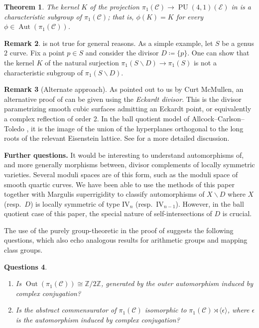 \documentclass[11pt]{amsart}
\theoremstyle{plain}
\newtheorem{thm}{Theorem}[section]
\newtheorem{qtns}[thm]{Questions}
\theoremstyle{definition}
\newtheorem{rem}[thm]{Remark}
\theoremstyle{remark}
\newcommand{\bbZ}{\mathbb{Z}}
\newcommand{\calC}{\mathcal{C}}
\newcommand{\calE}{\mathcal{E}}
\newcommand{\ep}{\epsilon}
\DeclareMathOperator{\PU}{PU}
\DeclareMathOperator{\Aut}{Aut}
\DeclareMathOperator{\Out}{Out}
\newcommand{\ssm}{\smallsetminus}
\begin{document}
\begin{thm}\label{thmKchar}
The kernel $K$ of the projection $\pi_1(\calC) \to \PU(4,1)(\calE)$ in  is a \emph{characteristic} subgroup of $\pi_1(\calC)$; that is, $\phi(K)=K$ for every $\phi\in\Aut(\pi_1(\calC))$.
\end{thm}

\begin{rem}
 is not true for general reasons. As a simple example, let $S$ be a genus $2$ curve. Fix a point $p\in S$ and consider the divisor $D \coloneqq \{p\}$. One can show that the kernel $K$ of the natural surjection $\pi_1(S\ssm D) \to \pi_1(S)$ is not a characteristic subgroup of ${\pi_1(S\ssm D)}$.
\end{rem}

\begin{rem}[Alternate approach]\label{rmk0} 
As pointed out to us by Curt McMullen, an alternative proof of  can be given using the \emph{Eckardt divisor}. This is the divisor parametrizing smooth cubic surfaces admitting an Eckardt point, or equivalently a complex reflection of order 2. In the ball quotient model of Allcock--Carlson--Toledo \cite{ACT}, it is the image of the union of the hyperplanes orthogonal to the long roots of the relevant Eisenstein lattice. See  for a more detailed discussion.
\end{rem}

\noindent
\textbf{Further questions.} It would be interesting to understand automorphisms of, and more generally morphisms between, divisor complements of locally symmetric varieties. Several moduli spaces are of this form, such as the moduli space of smooth quartic curves. We have been able to use the methods of this paper together with Margulis superrigidity to classify automorphisms of $X \ssm D$ where $X$ (resp.\ $D$) is locally symmetric of type $\textrm{IV}_n$ (resp.\ $\textrm{IV}_{n-1}$). However, in the ball quotient case of this paper, the special nature of self-intersections of $D$ is crucial.
\medskip

The use of the purely group-theoretic  in the proof of  suggests the following questions, which also echo analogous results for arithmetic groups and mapping class groups.

\begin{qtns}{\ }
\begin{enumerate}

\item Is $\Out(\pi_1(\calC)) \cong \bbZ / 2\bbZ$, generated by the outer automorphism induced by complex conjugation?

\item Is the abstract commensurator of $\pi_1(\calC)$ isomorphic to $\pi_1(\calC) \rtimes \langle \ep \rangle$, where $\ep$ is the automorphism induced by complex conjugation?

\end{enumerate}
\end{qtns}
\end{document}

